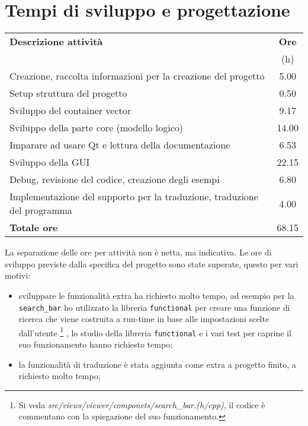 \documentclass[a4paper,10pt]{article}
\begin{document}
\section {Tempi di sviluppo e progettazione}
\begin{tabular}{lS}
\toprule
\textbf{Descrizione attività} & \textbf{{Ore}} \\
                              &       {(h)}    \\
\midrule
Creazione, raccolta informazioni per la creazione del progetto      & 5.00  \\
Setup struttura del progetto                                        & 0.50  \\
Sviluppo del container vector                                       & 9.17  \\
Sviluppo della parte core (modello logico)                          & 14.00 \\
Imparare ad usare Qt e lettura della documentazione                 & 6.53  \\
Sviluppo della GUI                                                  & 22.15 \\
Debug, revisione del codice, creazione degli esempi                 & 6.80  \\
Implementazione del supporto per la traduzione, traduzione del
programma                                                           & 4.00  \\
\midrule
\textbf{Totale ore}                                                 & 68.15 \\
\bottomrule
\end{tabular}
\newline

La separazione delle ore per attività non è netta, ma indicativa. Le ore di sviluppo previste dalla specifica del progetto sono state superate, questo per vari motivi:
\begin{itemize}
\item sviluppare le funzionalità extra ha richiesto molto tempo, ad esempio per la \texttt{search\_bar} ho utilizzato la libreria \texttt{functional} per creare una funzione di ricerca che viene costruita a run-time in base alle impostazioni scelte dall'utente%
\footnote{Si veda \emph{src/views/viewer/componets/search\_bar.(h/cpp)}, il codice è commentano con la spiegazione del suo funzionamento.}%
, lo studio della libreria \texttt{functional} e i vari test per caprine il suo funzionamento hanno richiesto tempo;
\item la funzionalità di traduzione è stata aggiunta come extra a progetto finito, a richiesto molto tempo;
\end{itemize}
\end{document}
